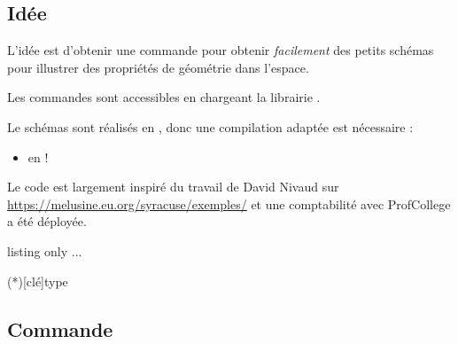 \subsection{Idée}

\begin{tipblock}
 L'idée est d'obtenir une commande pour obtenir \textit{facilement} des petits schémas pour illustrer des propriétés de géométrie dans l'espace.

\smallskip

Les commandes sont accessibles en chargeant la librairie .

\smallskip

Le schémas sont réalisés en , donc une compilation adaptée est nécessaire :

\begin{itemize}
	\item en  !
\end{itemize}
\vspace*{-\baselineskip}\leavevmode
\end{tipblock}

\begin{importantblock}
 Le code  est largement inspiré du travail de David Nivaud sur \url{https://melusine.eu.org/syracuse/exemples/} et une comptabilité avec \textsf{ProfCollege} a été déployée.
\end{importantblock}

\begin{PresCodeTexPL}{listing only}
...

\SchemaEspace(*)[clé]{type}
\end{PresCodeTexPL}

\subsection{Commande}

